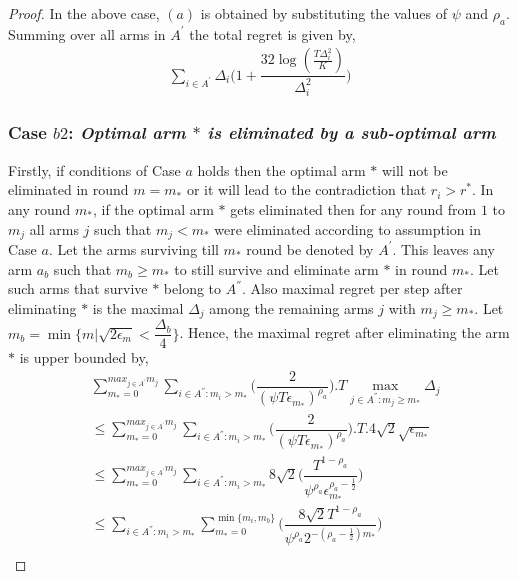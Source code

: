 \begin{proof}
In the above case, $(a)$ is obtained by substituting the values of $\psi$ and $\rho_a$. Summing over all arms in $A^{'}$ the total regret is given by, 
\begin{align*}
\sum_{i\in A^{'}}\Delta_{i}\bigg(1+\dfrac{32\log{( \frac{T\Delta_i^2}{K})}}{\Delta_{i}^{2}}\bigg)
\end{align*}

\subsubsection*{Case $b2$: \textit{Optimal arm ${*}$ is eliminated by a sub-optimal arm  }}


	Firstly, if conditions of Case $a$ holds then the optimal arm ${*}$ will not be eliminated in round $m=m_{*}$ or it will lead to the contradiction that $r_{i}>r^{*}$. In any round $m_{*}$, if the optimal arm ${*}$ gets eliminated then for any round from $1$ to $m_{j}$ all arms ${j}$ such that $m_{j}< m_{*}$ were eliminated according to assumption in Case $a$. Let the arms surviving till $m_{*}$ round be denoted by $A^{'}$. This leaves any arm $a_{b}$ such that $m_{b}\geq m_{*}$ to still survive and eliminate arm ${*}$ in round $m_{*}$. Let such arms that survive ${*}$ belong to $A^{''}$. Also maximal regret per step after eliminating ${*}$ is the maximal $\Delta_{j}$ among the remaining arms ${j}$ with $m_{j}\geq m_{*}$.  Let $m_{b}=\min\lbrace m|\sqrt{2\epsilon_{m}}<\dfrac{\Delta_{b}}{4}\rbrace$. Hence, the maximal regret after eliminating the arm ${*}$ is upper bounded by, 
\begin{align*}
&\sum_{m_{*}=0}^{max_{j\in A^{'}}m_{j}}\sum_{i\in A^{''}:m_{i}>m_{*}}\bigg(\dfrac{2}{(\psi  T\epsilon_{m_{*}})^{\rho_{a}}} \bigg).T\max_{j\in A^{''}:m_{j}\geq m_{*}}{\Delta}_{j}\\
&\leq\sum_{m_{*}=0}^{max_{j\in A^{'}}m_{j}}\sum_{i\in A^{''}:m_{i}>m_{*}}\bigg(\dfrac{2}{(\psi  T\epsilon_{m_{*}})^{\rho_{a}}} \bigg).T.4\sqrt{2}\sqrt{\epsilon_{m_{*}}}\\
&\leq\sum_{m_{*}=0}^{max_{j\in A^{'}}m_{j}}\sum_{i\in A^{''}:m_{i}>m_{*}}8\sqrt{2}\bigg(\dfrac{T^{1-\rho_{a}}}{\psi^{\rho_{a}}\epsilon_{m_{*}}^{\rho_{a}-\frac{1}{2}}} \bigg)\\
&\leq\sum_{i\in A^{''}:m_{i}>m_{*}}\sum_{m_{*}=0}^{\min{\lbrace m_{i},m_{b}\rbrace}}\bigg(\dfrac{8\sqrt{2}T^{1-\rho_{a}}}{\psi^{\rho_{a}}2^{-(\rho_{a}-\frac{1}{2})m_{*}}} \bigg)\\

\end{align*}
\end{proof}
